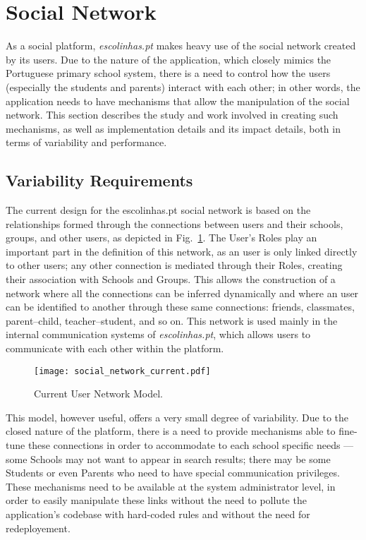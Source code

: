 \section{Social Network}\label{sec:fa_social_network}

As a social platform, \emph{escolinhas.pt} makes heavy use of the social network created by its users. Due to the nature of the application, which closely mimics the Portuguese primary school system, there is a need to control how the users (especially the students and parents) interact with each other; in other words, the application needs to have mechanisms that allow the manipulation of the social network. This section describes the study and work involved in creating such mechanisms, as well as implementation details and its impact details, both in terms of variability and performance.

\subsection{Variability Requirements}\label{sec:fa_social_network_variability_requirements}

The current design for the escolinhas.pt social network is based on the relationships formed through the connections between users and their schools, groups, and other users, as depicted in Fig.~\ref{fig:social_network_current}. The User's Roles play an important part in the definition of this network, as an user is only linked directly to other users; any other connection is mediated through their Roles, creating their association with Schools and Groups. This allows the construction of a network where all the connections can be inferred dynamically and where an user can be identified to another through these same connections: friends, classmates, parent--child, teacher--student, and so on. This network is used mainly in the internal communication systems of \emph{escolinhas.pt}, which allows users to communicate with each other within the platform.

\begin{figure}[H]
  \centering
  \texttt{[image: social\_network\_current.pdf]}
  \caption{Current User Network Model.}
  \label{fig:social_network_current}
\end{figure}

This model, however useful, offers a very small degree of variability. Due to the closed nature of the platform, there is a need to provide mechanisms able to fine-tune these connections in order to accommodate to each school specific needs --- some Schools may not want to appear in search results; there may be some Students or even Parents who need to have special communication privileges. These mechanisms need to be available at the system administrator level, in order to easily manipulate these links without the need to pollute the application's codebase with hard-coded rules and without the need for redeployement.

